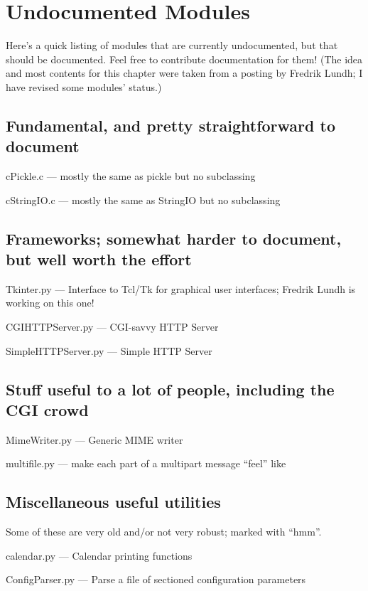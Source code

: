 \chapter{Undocumented Modules}
\label{undoc}

Here's a quick listing of modules that are currently undocumented, but
that should be documented.  Feel free to contribute documentation for
them!  (The idea and most contents for this chapter were taken from a
posting by Fredrik Lundh; I have revised some modules' status.)


\section{Fundamental, and pretty straightforward to document}

cPickle.c --- mostly the same as pickle but no subclassing

cStringIO.c --- mostly the same as StringIO but no subclassing


\section{Frameworks; somewhat harder to document, but well worth the effort}

Tkinter.py --- Interface to Tcl/Tk for graphical user interfaces;
Fredrik Lundh is working on this one!

CGIHTTPServer.py --- CGI-savvy HTTP Server

SimpleHTTPServer.py --- Simple HTTP Server


\section{Stuff useful to a lot of people, including the CGI crowd}

MimeWriter.py --- Generic MIME writer

multifile.py --- make each part of a multipart message ``feel'' like


\section{Miscellaneous useful utilities}

Some of these are very old and/or not very robust; marked with ``hmm''.

calendar.py --- Calendar printing functions

ConfigParser.py --- Parse a file of sectioned configuration parameters

